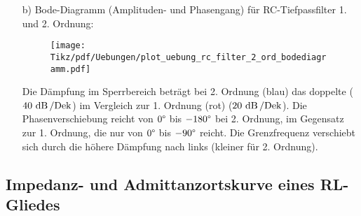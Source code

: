 {\begin{itemize}
\begin{align*}
            &= \frac{1}{1 - \Omega^2 + \mathrm{j}3\Omega} = \frac{1}{1 - (\omega C R)^2 + \mathrm{j}3\omega C R}
    \end{align*}
    Vergleich einfacher Tiefpass:
    \begin{align*}
        \underline{F}(\mathrm{j}\omega) = \frac{\frac{1}{\mathrm{j}\omega C}}{R + \frac{1}{\mathrm{j}\omega C}} = \frac{1}{1 + \mathrm{j}\omega C R} = \frac{1}{1 + \mathrm{j}\Omega}
    \end{align*}
    Wegen Kopplungseffekten kann der Frequenzgang des einfachen Tiefpasses bei Serienschaltung
    nicht einfach multipliziert werden.

    \item[b)] Bode-Diagramm (Amplituden- und Phasengang) für RC-Tiefpassfilter 1. und 2. Ordnung:
    \begin{figure}[H]\centering
        \texttt{[image: Tikz/pdf/Uebungen/plot\_uebung\_rc\_filter\_2\_ord\_bodediagramm.pdf]}%
    \end{figure}
    Die Dämpfung im Sperrbereich beträgt bei 2. Ordnung (blau) das doppelte ($40\,\operatorname{dB}/\mathrm{Dek}$)
    im Vergleich zur 1. Ordnung (rot) ($20\,\operatorname{dB}/\mathrm{Dek}$).
    Die Phasenverschiebung reicht von $0\degree$ bis $-180\degree$ bei 2. Ordnung,
    im Gegensatz zur 1. Ordnung, die nur von $0\degree$ bis $-90\degree$ reicht.
    Die Grenzfrequenz verschiebt sich durch die höhere Dämpfung nach links (kleiner für 2. Ordnung).
\end{itemize}
}


\subsection{Impedanz- und Admittanzortskurve eines RL-Gliedes\label{ueb:ortskurve:rl}}


